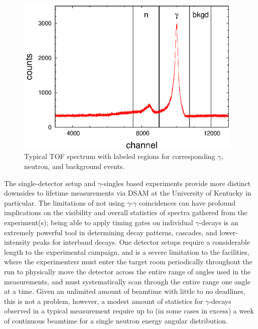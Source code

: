 \begin{figure}[h] 
\begin{center}
\includegraphics[width=0.97\textwidth]{TAC_spectrum.eps}
\caption{Typical TOF spectrum with labeled regions for corresponding $\gamma$, neutron, and background events.\label{fig:TOF_spec}} %
\end{center}
\end{figure}

The single-detector setup and $\gamma$-singles based experiments provide more distinct downsides to lifetime measurements via DSAM at the University of Kentucky in particular. The limitations of not using $\gamma$-$\gamma$ coincidences can have profound implications on the visibility and overall statistics of spectra gathered from the experiment(s); being able to apply timing gates on individual $\gamma$-decays is an extremely powerful tool in determining decay patterns, cascades, and lower-intensity peaks for interband decays. One detector setups require a considerable length to the experimental campaign, and is a severe limitation to the facilities, where the experimenters must enter the target room periodically throughout the run to physically move the detector across the entire range of angles used in the measurements, and must systematically scan through the entire range one angle at a time. Given an unlimited amount of beamtime with little to no deadlines, this is not a problem, however, a modest amount of statistics for $\gamma$-decays observed in a typical measurement require up to (in some cases in excess) a week of continuous beamtime for a single neutron energy angular distribution. 

